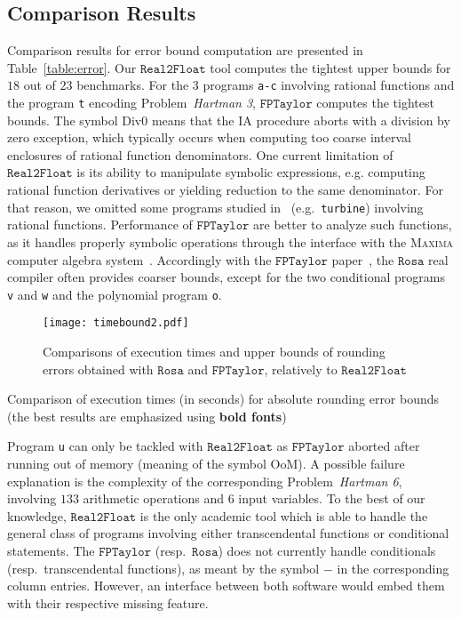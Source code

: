 \documentclass[preprint,fleqn,nocopyrightspace]{sigplanconf}
\newcommand{\code}[1]{\lstinline{#1}}
\newcommand{\nbenchs}{23}
\newcommand{\divzero}{\text{Div0}}
\newcommand{\realtofloat}{\mathtt{Real2Float}}
\newcommand{\rosa}{\mathtt{Rosa}}
\newcommand{\fptaylor}{\mathtt{FPTaylor}}
\theoremstyle{plain}
\begin{document}
\subsection{Comparison Results}
%
Comparison results for error bound computation are presented in Table~\ref{table:error}. 
%
Our $\realtofloat$ tool computes the tightest upper bounds for $18$ out of $\nbenchs$ benchmarks. For the $3$ programs \code{a-c} involving rational functions and the program \code{t} encoding Problem~\textit{Hartman 3}, $\fptaylor$ computes the tightest bounds. The symbol $\divzero$ means that the IA procedure aborts with a division by zero exception, which typically occurs when computing too coarse interval enclosures of rational function denominators.
One current limitation of $\realtofloat$ is its ability to manipulate symbolic expressions, e.g. computing rational function derivatives or yielding reduction to the same denominator. For that reason, we omitted some programs studied in~\cite{fptaylor15} (e.g.~\code{turbine}) involving rational functions.
Performance of $\fptaylor$ are better to analyze such functions, as it handles properly symbolic operations through the interface with the \textsc{Maxima} computer algebra system~\cite{maxima}.
Accordingly with the $\fptaylor$ paper~\cite{fptaylor15}, the $\rosa$ real compiler often provides coarser bounds, except for the two conditional programs \code{v} and \code{w} and the polynomial program \code{o}.
%
\begin{figure}[!ht]
\begin{center}
\texttt{[image: timebound2.pdf]}
\caption{Comparisons of execution times and upper bounds of rounding errors obtained with $\rosa$ and $\fptaylor$, relatively to $\realtofloat$}\label{fig:timebound}
\end{center}
\end{figure}
%
\begin{table}[!ht]
\begin{center}
\caption{Comparison of execution times (in seconds) for absolute rounding error bounds (the best results are emphasized using \textbf{bold fonts})}

\label{table:cpu}
\end{center}
\end{table}
%
Program \code{u} can only be tackled with $\realtofloat$ as $\fptaylor$ aborted after running out of memory (meaning of the symbol OoM). A possible failure explanation is the complexity of the corresponding Problem~\textit{Hartman 6}, involving $133$ arithmetic operations and $6$ input variables.
To the best of our knowledge, $\realtofloat$ is the only academic tool which is able to handle the general class of programs involving either transcendental functions or conditional statements. The $\fptaylor$ (resp.~$\rosa$) does not currently handle conditionals (resp.~transcendental functions), as meant by the symbol $-$ in the corresponding column entries. However, an interface between both software would embed them with their respective missing feature.
\end{document}

